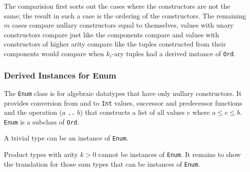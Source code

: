 The comparision first sorts out the cases where the constructors are not the same; the result in such a case is the ordering of the constructors. The remaining $m$ cases compare nullary constructors equal to themselves, values with unary constructors compare just like the components compare and values with constructors of higher arity compare like the tuples constructed from their components would compare when $k_i$-ary tuples had a derived instance of \texttt{Ord}.

\subsubsection{Derived Instances for Enum}

The \texttt{Enum} class is for algebraic datatypes that have only nullary constructors.
It provides conversion from and to \texttt{Int} values, successor and predecessor functions and the operation ($a$ \texttt{..} $b$) that constructs a list of all values $e$ where $a \le e \le b$. \texttt{Enum} is a subclass of \texttt{Ord}.

A trivial type can be an instance of \texttt{Enum}.

Product types with arity $k>0$ cannot be instances of \texttt{Enum}. It remains to show the translation for those sum types that can be instances of \texttt{Enum}.

